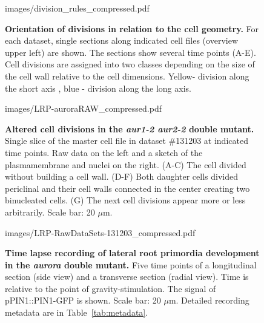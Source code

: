 \documentclass[11pt,a4paper, final]{article}
\begin{document}
%
\begin{figure}[htbp]
\centering
	\begin{overpic}[width=1.\linewidth]{images/division_rules_compressed.pdf}
	\end{overpic}
\caption[Orientation of divisions in relation to the cell geometry.]
{{\bf Orientation of divisions in relation to the cell geometry.} For each dataset, single sections along indicated cell files (overview upper left) are shown. The sections show several time points (A-E). Cell divisions are assigned into two classes depending on the size of the cell wall relative to the cell dimensions. Yellow- division along the short axis , blue - division along the long axis. }
	\label{fig:divrules}
\end{figure}
%
%
%
%
\begin{figure}[htbp]
\centering
	\begin{overpic}[width=0.7\linewidth]{images/LRP-auroraRAW_compressed.pdf}
	\end{overpic}
\caption[Altered cell divisions in the \emph{aur1-2 aur2-2} double mutant. ]
{{\bf Altered cell divisions in the \emph{aur1-2 aur2-2} double mutant. } Single slice of the master cell file in dataset \#131203 at indicated time points. Raw data on the left and a sketch of the plasmamembrane and nuclei on the right. (A-C) The cell divided without building a cell wall. (D-F) Both daughter cells divided periclinal and their cell walls connected in the center creating two binucleated cells. (G) The next cell divisions appear more or less arbitrarily. Scale bar: 20 $\mu$m.}
	\label{fig:aurora}
\end{figure}
\clearpage
%

\begin{figure}[htbp]
\centering
	\begin{overpic}[width=1.\linewidth]{images/LRP-RawDataSets-131203_compressed.pdf}
	\end{overpic}
\caption[ Time lapse recording of lateral root primordia development in the \emph{aurora} double mutant.]
{{\bf Time lapse recording of lateral root primordia development in the \emph{aurora} double mutant.} Five time points of a longitudinal section (side view) and a transverse section (radial view). Time is relative to the point of gravity-stimulation. The signal of pPIN1::PIN1-GFP is shown. Scale bar: 20 $\mu$m. Detailed recording metadata are in Table~\ref{tab:metadata}.}
\label{fig:auroraRaw}
\end{figure}
\clearpage
\end{document}
